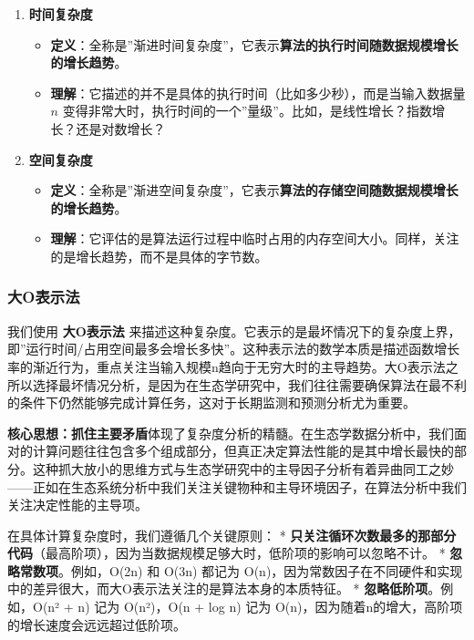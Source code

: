 \documentclass[
  twoside]{book}
\providecommand{\tightlist}{%
  \setlength{\itemsep}{0pt}\setlength{\parskip}{0pt}}
\begin{document}
\begin{enumerate}
\def\labelenumi{\arabic{enumi}.}
\tightlist
\item
  \textbf{时间复杂度}

  \begin{itemize}
  \tightlist
  \item
    \textbf{定义}：全称是''渐进时间复杂度''，它表示\textbf{算法的执行时间随数据规模增长的增长趋势}。
  \item
    \textbf{理解}：它描述的并不是具体的执行时间（比如多少秒），而是当输入数据量 \(n\) 变得非常大时，执行时间的一个''量级''。比如，是线性增长？指数增长？还是对数增长？
  \end{itemize}
\item
  \textbf{空间复杂度}

  \begin{itemize}
  \tightlist
  \item
    \textbf{定义}：全称是''渐进空间复杂度''，它表示\textbf{算法的存储空间随数据规模增长的增长趋势}。
  \item
    \textbf{理解}：它评估的是算法运行过程中临时占用的内存空间大小。同样，关注的是增长趋势，而不是具体的字节数。
  \end{itemize}
\end{enumerate}

\hypertarget{ux5927oux8868ux793aux6cd5}{%
\subsubsection{大O表示法}\label{ux5927oux8868ux793aux6cd5}}

我们使用 \textbf{大O表示法} 来描述这种复杂度。它表示的是最坏情况下的复杂度上界，即''运行时间/占用空间最多会增长多快''。这种表示法的数学本质是描述函数增长率的渐近行为，重点关注当输入规模n趋向于无穷大时的主导趋势。大O表示法之所以选择最坏情况分析，是因为在生态学研究中，我们往往需要确保算法在最不利的条件下仍然能够完成计算任务，这对于长期监测和预测分析尤为重要。

\textbf{核心思想：抓住主要矛盾}体现了复杂度分析的精髓。在生态学数据分析中，我们面对的计算问题往往包含多个组成部分，但真正决定算法性能的是其中增长最快的部分。这种抓大放小的思维方式与生态学研究中的主导因子分析有着异曲同工之妙------正如在生态系统分析中我们关注关键物种和主导环境因子，在算法分析中我们关注决定性能的主导项。

在具体计算复杂度时，我们遵循几个关键原则：
* \textbf{只关注循环次数最多的那部分代码}（最高阶项），因为当数据规模足够大时，低阶项的影响可以忽略不计。
* \textbf{忽略常数项}。例如，O(2n) 和 O(3n) 都记为 O(n)，因为常数因子在不同硬件和实现中的差异很大，而大O表示法关注的是算法本身的本质特征。
* \textbf{忽略低阶项}。例如，O(n² + n) 记为 O(n²)，O(n + log n) 记为 O(n)，因为随着n的增大，高阶项的增长速度会远远超过低阶项。
\end{document}
